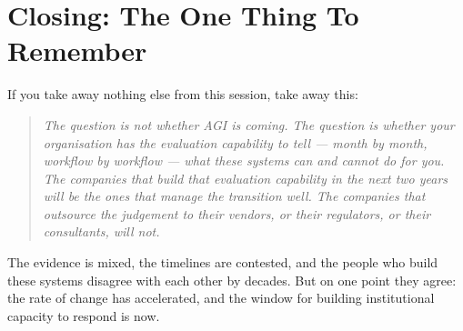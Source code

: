 \documentclass[11pt,a4paper]{article}
\begin{document}
\section*{Closing: The One Thing To Remember}

If you take away nothing else from this session, take away this:

\begin{quote}
\itshape The question is not whether AGI is coming. The question is
whether your organisation has the evaluation capability to tell ---
month by month, workflow by workflow --- what these systems can and
cannot do for you. The companies that build that evaluation capability
in the next two years will be the ones that manage the transition
well. The companies that outsource the judgement to their vendors, or
their regulators, or their consultants, will not.
\end{quote}

The evidence is mixed, the timelines are contested, and the people who
build these systems disagree with each other by decades. But on one
point they agree: the rate of change has accelerated, and the window
for building institutional capacity to respond is now.



\end{document}

